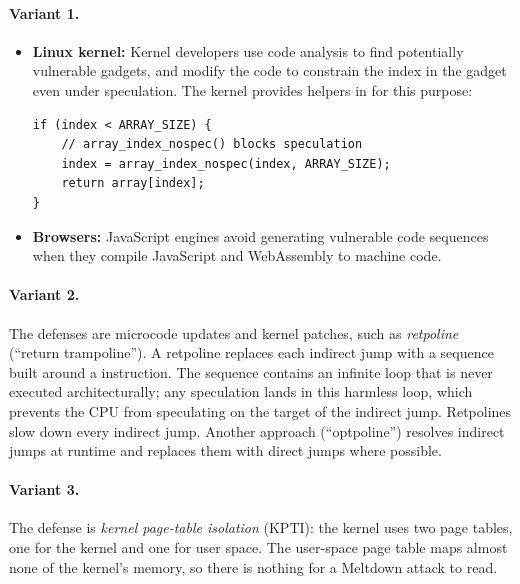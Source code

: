 \paragraph{Variant 1.}
\begin{itemize}
  \item \textbf{Linux kernel:} Kernel developers use code analysis to find
        potentially vulnerable gadgets, and modify the code to constrain
        the index in the gadget even under speculation.
        The kernel provides helpers in  for
        this purpose:
\begin{lstlisting}
if (index < ARRAY_SIZE) {
    // array_index_nospec() blocks speculation
    index = array_index_nospec(index, ARRAY_SIZE);
    return array[index];
}
\end{lstlisting}
  \item \textbf{Browsers:} JavaScript engines avoid generating vulnerable
        code sequences when they compile JavaScript and WebAssembly to
        machine code.
\end{itemize}

\paragraph{Variant 2.}
The defenses are microcode updates and kernel patches, such as
\emph{retpoline} (``return trampoline'').
A retpoline replaces each indirect jump with a sequence built around a
 instruction.
The sequence contains an infinite loop that is never executed
architecturally; any speculation lands in this harmless loop, which
prevents the CPU from speculating on the target of the indirect jump.
Retpolines slow down every indirect jump.
Another approach (``optpoline'') resolves indirect jumps at runtime and
replaces them with direct jumps where possible.

\paragraph{Variant 3.}
The defense is \emph{kernel page-table isolation} (KPTI): the kernel uses
two page tables, one for the kernel and one for user space.
The user-space page table maps almost none of the kernel's memory, so
there is nothing for a Meltdown attack to read.

